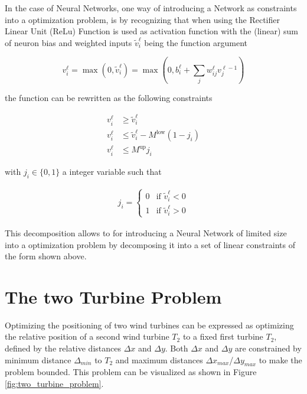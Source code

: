 In the case of Neural Networks, one way of introducing a Network as constraints into a optimization problem, is by recognizing that when using the Rectifier Linear Unit (ReLu) Function is used as activation function with the (linear) sum of neuron bias and weighted inputs $\tilde{v}_i^\ell$ being the function argument


\begin{equation}
	v_i^\ell = \max(0, \tilde{v}_i^\ell) = \max(0,  b_i^\ell + \sum_j w_{ij}^\ell v_j^{\ell - 1})
\end{equation}


the function can be rewritten as the following constraints 

\begin{align}
	v_i^\ell &\geq \tilde{v}_i^\ell \\
	v_i^\ell &\leq \tilde{v}_i^\ell - M^{\text{low}}(1 - j_i) \\
	v_i^\ell &\leq M^{\text{up}} j_i
\end{align}

with $j_i \in \{0,1\}$ a integer variable such that

\begin{align}
	j_i =
	\begin{cases}
		0 & \text{if } \tilde{v}_i^\ell < 0 \\
		1 & \text{if } \tilde{v}_i^\ell > 0
	\end{cases}
\end{align}

This decomposition allows to for introducing a Neural Network of limited size into a optimization problem by decomposing it into a set of linear constraints of the form shown above. \cite{ALCANTARA2023120895}

\section{The two Turbine Problem}

Optimizing the positioning of two wind turbines can be expressed as optimizing the relative position of a second wind turbine $T_2$ to a fixed first turbine $T_2$, defined by the relative distances $\Delta x$ and  $\Delta y$. Both  $\Delta x$ and  $\Delta y$ are constrained by minimum distance $\Delta_{min}$ to  $T_2$ and maximum distances $\Delta x_{max}$/$\Delta y_{max}$ to make the problem bounded. 
This problem can be visualized as shown in Figure \ref{fig:two_turbine_problem}.

